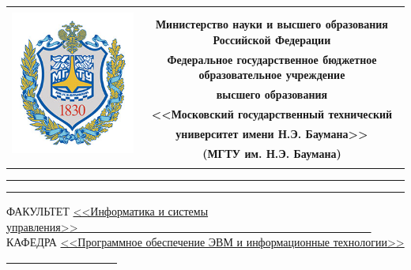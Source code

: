 \documentclass[12pt, a4paper]{report}
\begin{document}
	
	\begin{titlepage}
		
		\begin{table}[H]
			\centering
			\footnotesize
			\begin{tabular}{cc}
				\multirow{8}{*}{\includegraphics[scale=0.35]{img/bmstu.jpg}}
				& \\
				& \\
				& \textbf{Министерство науки и высшего образования Российской Федерации} \\
				& \textbf{Федеральное государственное бюджетное образовательное учреждение} \\
				& \textbf{высшего образования} \\
				& \textbf{<<Московский государственный технический} \\
				& \textbf{университет имени Н.Э. Баумана>>} \\
				& \textbf{(МГТУ им. Н.Э. Баумана)} \\
				& \textbf{} \\
			\end{tabular}
		\end{table}
		
		\vspace{-2.5cm}
		
		\begin{flushleft}
			\rule[-1cm]{\textwidth}{3pt}
			\rule{\textwidth}{1pt}
		\end{flushleft}
		
		\begin{flushleft}
			\small
			ФАКУЛЬТЕТ
			\underline{<<Информатика и системы управления>>\ \ \ \ \ \ \ 
				\ \ \ \ \ \ \ \ \ \ \ \ \ \ \ \ \ \ \ \ \ \ \ \ \ \ \ \ \ \ \ 
				\ \ \ \ \ \ \ \ \ \ \ \ \ \ \ } \\
			КАФЕДРА
			\underline{<<Программное обеспечение ЭВМ и
				информационные технологии>>
				\ \ \ \ \ \ \ \ \ \ \ \ \ \ \ \ \ \ \ \ }
		\end{flushleft}
		

\end{titlepage}
\end{document}
